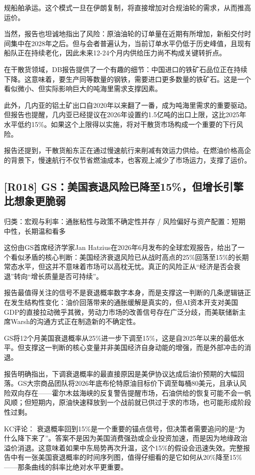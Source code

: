 \documentclass[11pt]{ctexart}
\begin{document}
规船舶承运。这个模式一旦在伊朗复制，将直接增加对合规油轮的需求，从而推高运价。

当然，报告也坦诚地指出了风险：原油油轮的订单量在近期有所增加，新船交付时间集中在2028年之后。但与会者普遍认为，当前订单水平仍低于历史峰值，且现有船队正在持续老化，因此未来12-24个月内供给压力尚不构成关键转折点。

在干散货领域，DB报告提供了一个有趣的细节：中国进口的铁矿石品位正在持续下降。这意味着，要生产同等数量的钢铁，需要进口更多数量的铁矿石。这是一个看似微小、但实际影响巨大的吨海里需求支撑因素。

此外，几内亚的铝土矿出口自2020年以来翻了一番，成为吨海里需求的重要驱动。但报告也提醒，几内亚已经提议在2026年设置约1.5亿吨的出口上限，这比2025年水平低约15\%。如果这个上限得以实施，将对干散货市场构成一个重要的下行风险。

报告还提到，干散货船东正在通过慢速航行来削减有效运力供给。在燃油价格高企的背景下，慢速航行不仅节省燃油成本，也客观上减少了市场运力，支撑了运价。

\subsection{[R018] GS：美国衰退风险已降至15\%，但增长引擎比想象更脆弱}
{\small\color{refgray}归类：宏观与利率：通胀粘性与政策不确定性并存 / 风险偏好与资产配置：短期中性，长期温和看多}

这份由GS首席经济学家Jan Hatzius在2026年6月发布的全球宏观报告，给出了一个看似矛盾的核心判断：美国经济衰退风险已从战时高点的25\%回落至15\%的长期常态水平，但这并不意味着市场可以高枕无忧。真正的风险正从“经济是否会衰退”转向“增长质量是否可持续”。

报告最值得关注的信号不是衰退概率数字本身，而是支撑这一判断的几条逻辑链正在发生结构性变化：油价回落带来的通胀缓解是真实的，但AI资本开支对美国GDP的直接拉动微乎其微，劳动力市场的改善信号存在广泛分歧，而美联储新主席Warsh的沟通方式正在制造新的不确定性。

GS将12个月美国衰退概率从25\%进一步下调至15\%，这是自2025年以来的最低水平。但支撑这一判断的核心变量并非美国经济自身动能的增强，而是外部冲击的消退。

报告明确指出，下调衰退概率的最直接原因是美伊协议达成后油价预期的大幅回落。GS大宗商品团队将2026年底布伦特原油目标价下调至每桶80美元，且承认风险双向存在——霍尔木兹海峡的反复警告提醒市场，石油供给的恢复可能不会一帆风顺；但短期内，原油快速释放到一个战前就已供过于求的市场，也可能形成阶段性过剩。

KC评论： 衰退概率回到15\%是一个重要的锚点信号，但决策者需要追问的是“为什么降下来了”。答案不是因为美国消费强劲或企业投资加速，而是因为地缘政治溢价消退。这意味着如果中东局势再次升温，这个15\%的假设会迅速失效。完整报告中有一张美国衰退概率的时间序列图，值得仔细看的是它如何从20\%降至15\%——那条曲线的斜率比绝对水平更重要。
\end{document}
